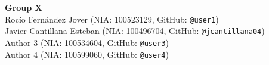 \textbf{Group X}\\[0.5em]
Rocío Fernández Jover (NIA: 100523129, GitHub: \texttt{@user1})\\
Javier Cantillana Esteban (NIA: 100496704, GitHub: \texttt{@jcantillana04})\\
Author 3 (NIA: 100534604, GitHub: \texttt{@user3})\\
Author 4 (NIA: 100599060, GitHub: \texttt{@user4})\\
